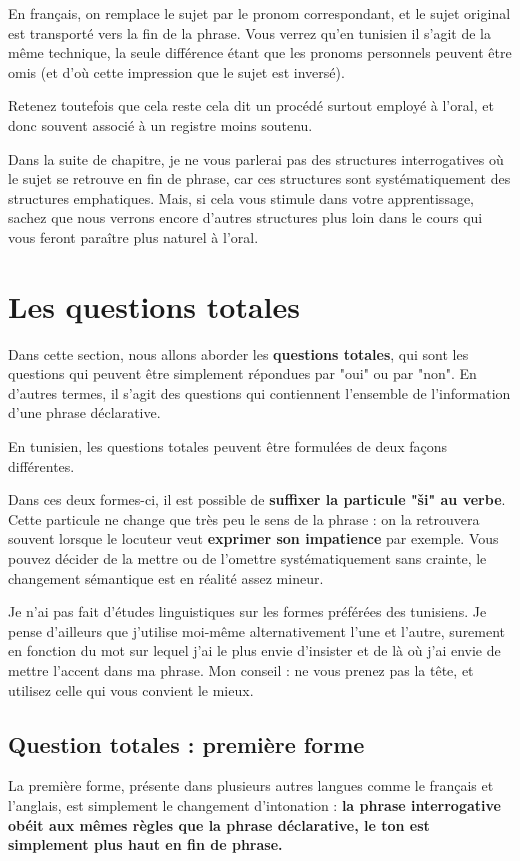 En français, on remplace le sujet par le pronom correspondant, et le sujet original est transporté vers la fin de la phrase. Vous verrez qu'en tunisien il s'agit de la même technique, la seule différence étant que les pronoms personnels peuvent être omis (et d'où cette impression que le sujet est inversé).

Retenez toutefois que cela reste cela dit un procédé surtout employé à l'oral, et donc souvent associé à un registre moins soutenu.

Dans la suite de chapitre, je ne vous parlerai pas des structures interrogatives où le sujet se retrouve en fin de phrase, car ces structures sont systématiquement des structures emphatiques. Mais, si cela vous stimule dans votre apprentissage, sachez que nous verrons encore d'autres structures plus loin dans le cours qui vous feront paraître plus naturel à l'oral.

\section{Les questions totales}
Dans cette section, nous allons aborder les \textbf{questions totales}, qui sont les questions qui peuvent être simplement répondues par "oui" ou par "non". En d'autres termes, il s'agit des questions qui contiennent l'ensemble de l'information d'une phrase déclarative.

En tunisien, les questions totales peuvent être formulées de deux façons différentes.

Dans ces deux formes-ci, il est possible de \textbf{suffixer la particule "\v{s}i" au verbe}. Cette particule ne change que très peu le sens de la phrase : on la retrouvera souvent lorsque le locuteur veut \textbf{exprimer son impatience} par exemple. Vous pouvez décider de la mettre ou de l'omettre systématiquement sans crainte, le changement sémantique est en réalité assez mineur.

Je n'ai pas fait d'études linguistiques sur les formes préférées des tunisiens. Je pense d'ailleurs que j'utilise moi-même alternativement l'une et l'autre, surement en fonction du mot sur lequel j'ai le plus envie d'insister et de là où j'ai envie de mettre l'accent dans ma phrase. Mon conseil : ne vous prenez pas la tête, et utilisez celle qui vous convient le mieux.

\subsection{Question totales : première forme}
La première forme, présente dans plusieurs autres langues comme le français et l'anglais, est simplement le changement d'intonation : \textbf{la phrase interrogative obéit aux mêmes règles que la phrase déclarative, le ton est simplement plus haut en fin de phrase.}

